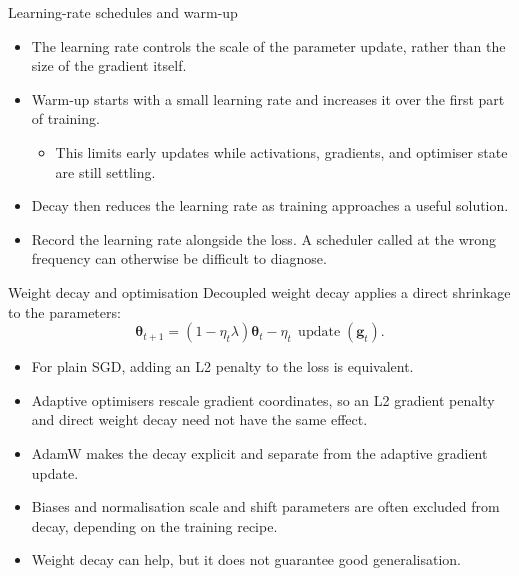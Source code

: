 \begin{frame}{Learning-rate schedules and warm-up}
\begin{itemize}
  \item The learning rate controls the scale of the parameter update, rather than the size of the gradient itself.
  \item Warm-up starts with a small learning rate and increases it over the first part of training.
  \begin{itemize}
    \item This limits early updates while activations, gradients, and optimiser state are still settling.
  \end{itemize}
  \item Decay then reduces the learning rate as training approaches a useful solution.
  \item Record the learning rate alongside the loss. A scheduler called at the wrong frequency can otherwise be difficult to diagnose.
\end{itemize}

\end{frame}


\begin{frame}{Weight decay and optimisation}
Decoupled weight decay applies a direct shrinkage to the parameters:
\[
  \bm\theta_{t+1}
  =(1-\eta_t\lambda)\bm\theta_t
  -\eta_t\,\operatorname{update}(\bm g_t).
\]

\begin{itemize}
  \item For plain SGD, adding an L2 penalty to the loss is equivalent.
  \item Adaptive optimisers rescale gradient coordinates, so an L2 gradient penalty and direct weight decay need not have the same effect.
  \item AdamW makes the decay explicit and separate from the adaptive gradient update.
  \item Biases and normalisation scale and shift parameters are often excluded from decay, depending on the training recipe.
  \item Weight decay can help, but it does not guarantee good generalisation.
\end{itemize}
\end{frame}

